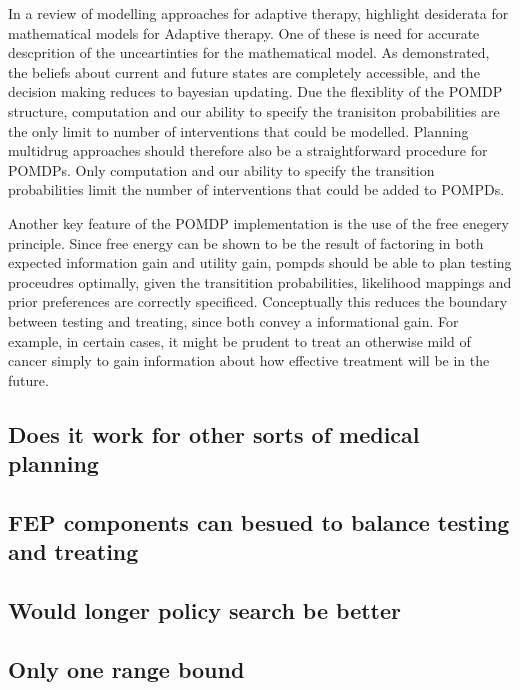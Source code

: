 \documentclass[notspecified,article,submit,moreauthors,pdftex]{Definitions/mdpi}
\begin{document}
In a review of modelling approaches for adaptive therapy,
\citep{west2023} highlight desiderata for mathematical models for
Adaptive therapy. One of these is need for accurate descprition of the
unceartinties for the mathematical model. As demonstrated, the beliefs
about current and future states are completely accessible, and the
decision making reduces to bayesian updating. Due the flexiblity of the
POMDP structure, computation and our ability to specify the tranisiton
probabilities are the only limit to number of interventions that could
be modelled. Planning multidrug approaches should therefore also be a
straightforward procedure for POMDPs. Only computation and our ability
to specify the transition probabilities limit the number of
interventions that could be added to POMPDs.

Another key feature of the POMDP implementation is the use of the free
enegery principle. Since free energy can be shown to be the result of
factoring in both expected information gain and utility gain, pompds
should be able to plan testing proceudres optimally, given the
transitition probabilities, likelihood mappings and prior preferences
are correctly specificed. Conceptually this reduces the boundary between
testing and treating, since both convey a informational gain. For
example, in certain cases, it might be prudent to treat an otherwise
mild of cancer simply to gain information about how effective treatment
will be in the future.

\subsection{Does it work for other sorts of medical
planning}\label{does-it-work-for-other-sorts-of-medical-planning}

\subsection{FEP components can besued to balance testing and
treating}\label{fep-components-can-besued-to-balance-testing-and-treating}

\subsection{Would longer policy search be
better}\label{would-longer-policy-search-be-better}

\subsection{Only one range bound}\label{only-one-range-bound}
\end{document}
